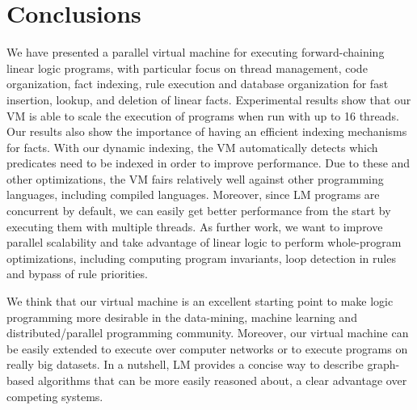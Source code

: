 \section{Conclusions}

We have presented a parallel virtual machine for executing
forward-chaining linear logic programs, with particular focus on
thread management, code organization, fact indexing, rule execution
and database organization for fast insertion, lookup, and deletion of
linear facts. Experimental results show that our VM is able to scale
the execution of programs when run with up to 16 threads.
Our results also show the importance of having an efficient indexing mechanisms
for facts. With our dynamic indexing, the VM automatically detects which predicates
need to be indexed in order to improve performance.
Due to these and other optimizations, the VM fairs relatively well against other programming languages, including
compiled languages. Moreover, since LM programs are
concurrent by default, we can easily get better performance from the
start by executing them with multiple threads.
As further work, we want to improve parallel scalability and
take advantage of linear logic to perform whole-program
optimizations, including computing program invariants, loop detection
in rules and bypass of rule priorities.

We think that our virtual machine is an excellent starting point to make
logic programming more desirable in the data-mining, machine learning and
distributed/parallel programming community. Moreover, our virtual machine can
be easily extended to execute over computer networks or to execute programs on really big datasets.
In a nutshell, LM provides a concise way to describe
graph-based algorithms that can be more easily reasoned about, a clear advantage over
competing systems.
